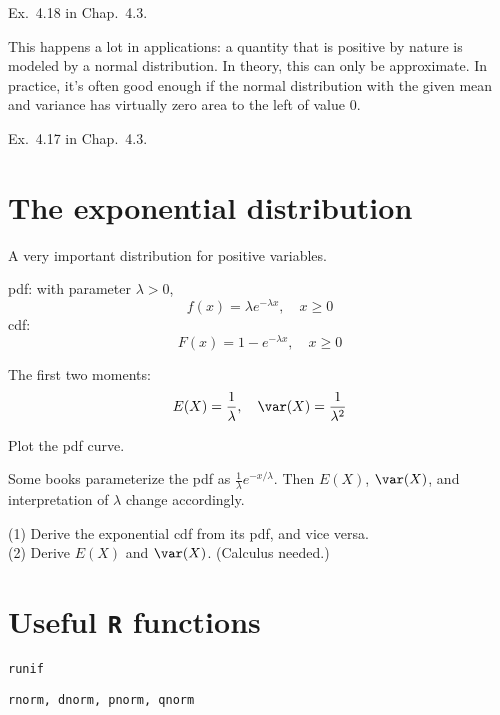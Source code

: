 \documentclass[12pt]{article}
\begin{document}

\example Ex.~4.18 in Chap.~4.3.


\alert
This happens a lot in applications:
a quantity that is positive by nature is modeled by a normal
distribution. In theory, this can only be approximate.
In practice, it's often good enough if the normal distribution with the
given mean and variance has virtually zero area to the left of value $0$.

\example Ex.~4.17 in Chap.~4.3.


\section{The exponential distribution}

A very important distribution for positive variables.

pdf: with parameter $\lambda > 0$,
\[
f(x) = \lambda e^{-\lambda x}, \quad x \ge 0
\]
cdf:
\[
F(x) = 1 - e^{-\lambda x}, \quad x \ge 0
\]

The first two moments:
\[
E(X) = \frac{1}{\lambda},\quad
\var(X) = \frac{1}{\lambda^2}
\]

Plot the pdf curve.


\alert
Some books parameterize the pdf as
$\frac{1}{\lambda} e^{-x/\lambda}$.
Then $E(X)$, $\var(X)$, and interpretation of $\lambda$
change accordingly.

\exercise
(1) Derive the exponential cdf from its pdf,
and vice versa.\\
(2) Derive $E(X)$ and $\var(X)$.
(Calculus needed.)


\section{Useful \texttt{R} functions}

\texttt{runif}

\texttt{rnorm, dnorm, pnorm, qnorm}
\end{document}
